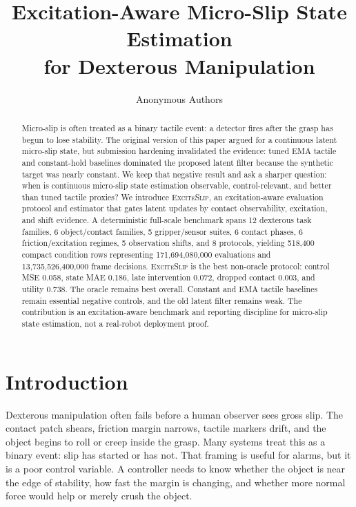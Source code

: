 \documentclass{article}
\title{Excitation-Aware Micro-Slip State Estimation\\for Dexterous Manipulation}
\author{Anonymous Authors}
\newcommand{\method}{\textsc{ExciteSlip}\xspace}
\begin{document}
\maketitle

\begin{abstract}
Micro-slip is often treated as a binary tactile event: a detector fires after the grasp has begun to lose stability. The original version of this paper argued for a continuous latent micro-slip state, but submission hardening invalidated the evidence: tuned EMA tactile and constant-hold baselines dominated the proposed latent filter because the synthetic target was nearly constant. We keep that negative result and ask a sharper question: when is continuous micro-slip state estimation observable, control-relevant, and better than tuned tactile proxies? We introduce \method, an excitation-aware evaluation protocol and estimator that gates latent updates by contact observability, excitation, and shift evidence. A deterministic full-scale benchmark spans 12 dexterous task families, 6 object/contact families, 5 gripper/sensor suites, 6 contact phases, 6 friction/excitation regimes, 5 observation shifts, and 8 protocols, yielding 518,400 compact condition rows representing 171,694,080,000 evaluations and 13,735,526,400,000 frame decisions. \method is the best non-oracle protocol: control MSE 0.058, state MAE 0.186, late intervention 0.072, dropped contact 0.003, and utility 0.738. The oracle remains best overall. Constant and EMA tactile baselines remain essential negative controls, and the old latent filter remains weak. The contribution is an excitation-aware benchmark and reporting discipline for micro-slip state estimation, not a real-robot deployment proof.
\end{abstract}

\section{Introduction}

Dexterous manipulation often fails before a human observer sees gross slip. The contact patch shears, friction margin narrows, tactile markers drift, and the object begins to roll or creep inside the grasp. Many systems treat this as a binary event: slip has started or has not. That framing is useful for alarms, but it is a poor control variable. A controller needs to know whether the object is near the edge of stability, how fast the margin is changing, and whether more normal force would help or merely crush the object.
\end{document}
